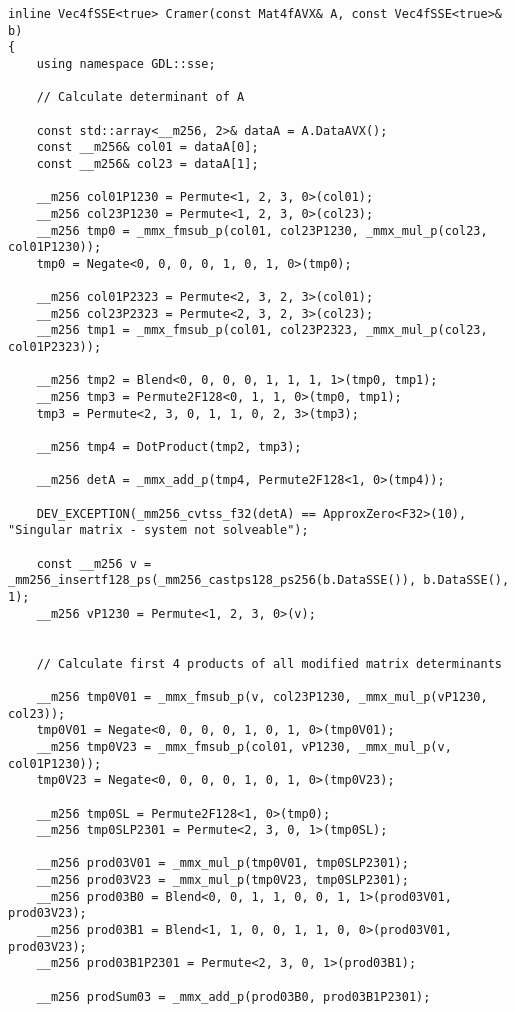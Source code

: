 \documentclass[]{scrartcl}
\begin{document}
\begin{verbatim}
inline Vec4fSSE<true> Cramer(const Mat4fAVX& A, const Vec4fSSE<true>& b)
{
    using namespace GDL::sse;

    // Calculate determinant of A

    const std::array<__m256, 2>& dataA = A.DataAVX();
    const __m256& col01 = dataA[0];
    const __m256& col23 = dataA[1];

    __m256 col01P1230 = Permute<1, 2, 3, 0>(col01);
    __m256 col23P1230 = Permute<1, 2, 3, 0>(col23);
    __m256 tmp0 = _mmx_fmsub_p(col01, col23P1230, _mmx_mul_p(col23, col01P1230));
    tmp0 = Negate<0, 0, 0, 0, 1, 0, 1, 0>(tmp0);

    __m256 col01P2323 = Permute<2, 3, 2, 3>(col01);
    __m256 col23P2323 = Permute<2, 3, 2, 3>(col23);
    __m256 tmp1 = _mmx_fmsub_p(col01, col23P2323, _mmx_mul_p(col23, col01P2323));

    __m256 tmp2 = Blend<0, 0, 0, 0, 1, 1, 1, 1>(tmp0, tmp1);
    __m256 tmp3 = Permute2F128<0, 1, 1, 0>(tmp0, tmp1);
    tmp3 = Permute<2, 3, 0, 1, 1, 0, 2, 3>(tmp3);

    __m256 tmp4 = DotProduct(tmp2, tmp3);

    __m256 detA = _mmx_add_p(tmp4, Permute2F128<1, 0>(tmp4));

    DEV_EXCEPTION(_mm256_cvtss_f32(detA) == ApproxZero<F32>(10), "Singular matrix - system not solveable");

    const __m256 v = _mm256_insertf128_ps(_mm256_castps128_ps256(b.DataSSE()), b.DataSSE(), 1);
    __m256 vP1230 = Permute<1, 2, 3, 0>(v);


    // Calculate first 4 products of all modified matrix determinants

    __m256 tmp0V01 = _mmx_fmsub_p(v, col23P1230, _mmx_mul_p(vP1230, col23));
    tmp0V01 = Negate<0, 0, 0, 0, 1, 0, 1, 0>(tmp0V01);
    __m256 tmp0V23 = _mmx_fmsub_p(col01, vP1230, _mmx_mul_p(v, col01P1230));
    tmp0V23 = Negate<0, 0, 0, 0, 1, 0, 1, 0>(tmp0V23);

    __m256 tmp0SL = Permute2F128<1, 0>(tmp0);
    __m256 tmp0SLP2301 = Permute<2, 3, 0, 1>(tmp0SL);

    __m256 prod03V01 = _mmx_mul_p(tmp0V01, tmp0SLP2301);
    __m256 prod03V23 = _mmx_mul_p(tmp0V23, tmp0SLP2301);
    __m256 prod03B0 = Blend<0, 0, 1, 1, 0, 0, 1, 1>(prod03V01, prod03V23);
    __m256 prod03B1 = Blend<1, 1, 0, 0, 1, 1, 0, 0>(prod03V01, prod03V23);
    __m256 prod03B1P2301 = Permute<2, 3, 0, 1>(prod03B1);

    __m256 prodSum03 = _mmx_add_p(prod03B0, prod03B1P2301);



\end{verbatim}
\end{document}
